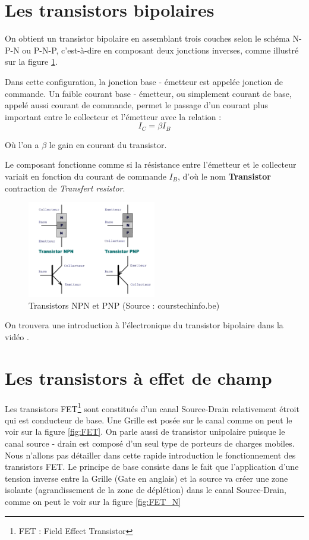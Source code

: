 \documentclass[a4paper,11pt]{book}
\theoremstyle{definition}
\begin{document}
\section{Les transistors bipolaires}
On obtient un transistor bipolaire en assemblant trois couches selon le schéma N-P-N ou P-N-P, c'est-à-dire en composant  deux jonctions inverses, comme illustré sur la figure \ref{fig:NPN_PNP}. 

Dans cette configuration, la jonction base - émetteur est appelée jonction de commande. Un faible courant base - émetteur, ou simplement courant de base, appelé aussi courant de commande, permet le passage d'un courant plus important entre le collecteur et l'émetteur avec la relation :
\[ I_C = \beta I_B   \]

Où l'on a $\beta$ le gain en courant du transistor.

Le composant fonctionne comme si la résistance entre l'émetteur et le collecteur variait en fonction du courant de commande $I_B$, d'où le nom \textbf{Transistor} contraction de \emph{Transfert resistor}.

\begin{figure}
\centering
\includegraphics[width=0.5\textwidth]{media/Semicon/NPN_PNP.png}
\caption{Transistors NPN et PNP (Source : courstechinfo.be)}
\label{fig:NPN_PNP}
\end{figure}

On trouvera une introduction à l'électronique du transistor bipolaire dans la vidéo \cite{transistor}.

\section{Les transistors à effet de champ}
Les transistors FET\footnote{FET : Field Effect Transistor} sont constitués d'un canal Source-Drain relativement étroit qui est conducteur de base. Une Grille est posée sur le canal comme on peut le voir sur la figure \ref{fig:FET}. On parle aussi de transistor unipolaire puisque le canal source - drain est composé d'un seul type de porteurs de charges mobiles.
Nous n'allons pas détailler dans cette rapide introduction le fonctionnement des transistors FET. Le principe de base consiste dans le fait que l'application d'une tension inverse entre la Grille (Gate en anglais) et la source va créer une zone isolante (agrandissement de la zone de déplétion) dans le canal Source-Drain, comme on peut le voir sur la figure \ref{fig:FET_N}
\end{document}
